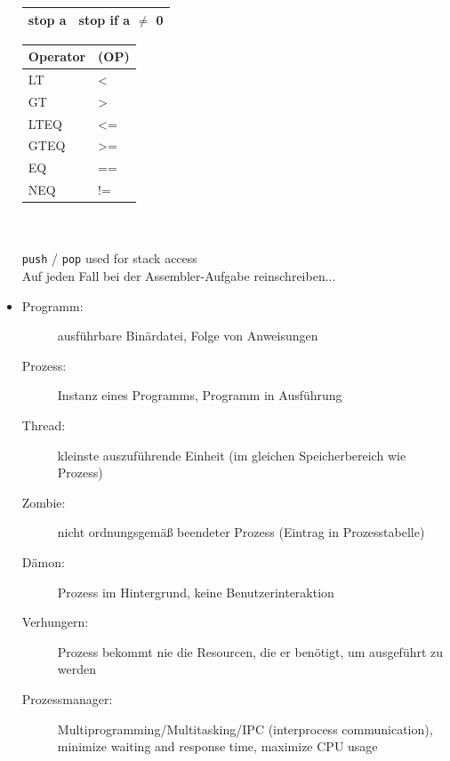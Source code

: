 \begin{itemize}
\begin{tabular}{|ll|}
  stop a      & stop if a $\neq$ 0 \\
  \hline
  \end{tabular}
  \begin{tabular}{|ll|}
  \hline Operator & (OP) \\
  \hline
  LT & < \\
  GT & > \\
  LTEQ & <= \\
  GTEQ & >= \\
  EQ & == \\
  NEQ & != \\
  \hline
  \end{tabular} \\ \\
  \texttt{push} / \texttt{pop} used for stack access \\
  Auf jeden Fall bei der Assembler-Aufgabe reinschreiben...
  \item
   \begin{description}
    \item[Programm:] ausführbare Binärdatei, Folge von Anweisungen
    \item[Prozess:] Instanz eines Programms, Programm in Ausführung
    \item[Thread:] kleinste auszuführende Einheit (im gleichen Speicherbereich wie Prozess)
    \item[Zombie:] nicht ordnungsgemäß beendeter Prozess (Eintrag in Prozesstabelle)
    \item[Dämon:] Prozess im Hintergrund, keine Benutzerinteraktion
    \item[Verhungern:] Prozess bekommt nie die Resourcen, die er benötigt, um ausgeführt zu werden
    \item[Prozessmanager:] Multiprogramming/Multitasking/IPC (interprocess communication), minimize waiting and response time, maximize CPU usage
   \end{description}
 \end{itemize}
 
